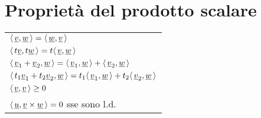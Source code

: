\section{Proprietà del prodotto scalare}
\begin{tabular}{l}
	$\langle\,\underline{v},\underline{w}\,\rangle = \langle\,\underline{w},\underline{v}\,\rangle$ \\
	$\langle\,t\underline{v},t\underline{w}\,\rangle = t\langle\,\underline{v},\underline{w}\,\rangle$ \\
	$\langle\,\underline{v}_1 + \underline{v}_2,\underline{w}\,\rangle = \langle\,\underline{v}_1,\underline{w}\,\rangle + \langle\,\underline{v}_2,\underline{w}\,\rangle$ \\
	$\langle\,t_1\underline{v}_1 + t_2\underline{v}_2,\underline{w}\,\rangle = t_1\langle\,\underline{v}_1,\underline{w}\,\rangle + t_2\langle\,\underline{v}_2,\underline{w}\,\rangle$ \\
	$\langle\,\underline{v},\underline{v}\,\rangle \ge 0$ \\
	$\langle\,\underline{u},\underline{v} \times \underline{w}\,\rangle = 0$ sse sono l.d. \\
\end{tabular}